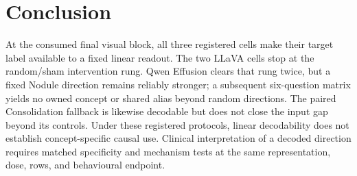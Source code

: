 \section{Conclusion}
\label{sec:conclusion}

At the consumed final visual block, all three registered cells make their target label available to a fixed linear readout. The two LLaVA cells stop at the random/sham intervention rung. Qwen Effusion clears that rung twice, but a fixed Nodule direction remains reliably stronger; a subsequent six-question matrix yields no owned concept or shared alias beyond random directions. The paired Consolidation fallback is likewise decodable but does not close the input gap beyond its controls. Under these registered protocols, linear decodability does not establish concept-specific causal use. Clinical interpretation of a decoded direction requires matched specificity and mechanism tests at the same representation, dose, rows, and behavioural endpoint.
